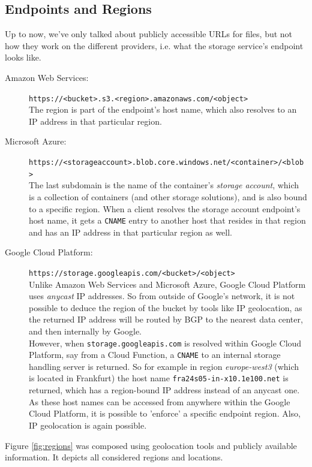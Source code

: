 \documentclass[a4paper,bibliography=totoc]{scrartcl}
\newcommand{\Azure}{Microsoft Azure\xspace}
\newcommand{\GCP}{Google Cloud Platform\xspace}
\newcommand{\AWS}{Amazon Web Services\xspace}
\begin{document}
\subsection{Endpoints and Regions}\label{sec:endpoints}
Up to now, we've only talked about publicly accessible URLs for files, but not how they work on the different providers, i.e. what the storage service's endpoint looks like.
\begin{description}
    \item[\AWS:] \texttt{https://<bucket>.s3.<region>.amazonaws.com/<object>}\cite{aws_s3_access}\\
    The region is part of the endpoint's host name, which also resolves to an IP address in that particular region. 
    \item[\Azure:] \texttt{https://<storageaccount>.blob.core.windows.net/<container>/<blob>}\cite{azure_storage_access}\\
    The last subdomain is the name of the container's \textit{storage account}, which is a collection of containers (and other storage solutions), and is also bound to a specific region.\cite{azure_storage_accounts} When a client resolves the storage account endpoint's host name, it gets a \texttt{CNAME} entry to another host that resides in that region and has an IP address in that particular region as well.
    \item[\GCP:] \texttt{https://storage.googleapis.com/<bucket>/<object>}\cite{gcp_storage_acces}\\
    Unlike \AWS and \Azure, \GCP uses \textit{anycast} IP addresses.\cite{cloudflare_anycast} So from outside of Google's network, it is not possible to deduce the region of the bucket by tools like IP geolocation, as the returned IP address will be routed by BGP to the nearest data center, and then internally by Google.\\
    However, when \texttt{storage.googleapis.com} is resolved within \GCP, say from a Cloud Function, a \texttt{CNAME} to an internal storage handling server is returned. So for example in region \textit{europe-west3} (which is located in Frankfurt) the host name \texttt{fra24s05-in-x10.1e100.net} is returned, which has a region-bound IP address instead of an anycast one. As these host names can be accessed from anywhere within the \GCP, it is possible to 'enforce' a specific endpoint region. Also, IP geolocation is again possible.
\end{description}
Figure \ref{fig:regions} was composed using geolocation tools and publicly available information.\cite{aws_regions,azure_regions,gcp_regions} It depicts all considered regions and locations.
\end{document}
